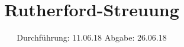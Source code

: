 

\subject{V16 }
\title{Rutherford-Streuung}
\date{
  Durchführung: 11.06.18
  \hspace{3em}
  Abgabe: 26.06.18
}



\maketitle
\thispagestyle{empty}
\tableofcontents
\newpage






\printbibliography


